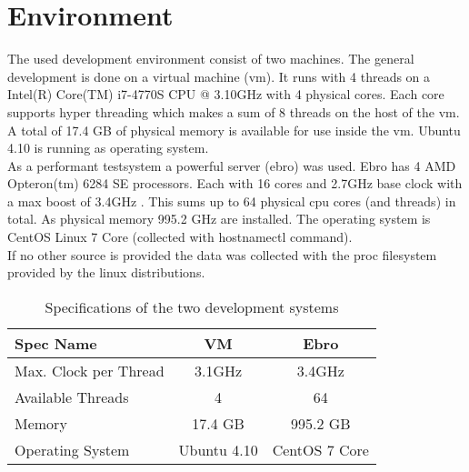 \section{Environment}
\label{env}
The used development environment consist of two machines. The general development is done on a virtual machine (vm). It runs with 4 threads on a Intel(R) Core(TM) i7-4770S CPU @ 3.10GHz with 4 physical cores. Each core supports hyper threading which makes a sum of 8 threads on the host of the vm. A total of 17.4 GB of physical memory is available for use inside the vm. Ubuntu 4.10 is running as operating system.\\
As a performant testsystem a powerful server (ebro) was used. Ebro has 4 AMD Opteron(tm) 6284 SE processors. Each with 16 cores and 2.7GHz base clock with a max boost of 3.4GHz \cite{AMDSpecs}. This sums up to 64 physical cpu cores (and threads) in total. As physical memory 995.2 GHz are installed. The operating system is CentOS Linux 7 Core (collected with hostnamectl command).\\
If no other source is provided the data was collected with the proc filesystem provided by the linux distributions.
\begin{center}
    \begin{table}[H]
        \centering
        \begin{tabular}{ | l | c | c |}
            \hline
            \textbf{Spec Name} & \textbf{VM} & \textbf{Ebro} \\ \hline
            Max. Clock per Thread & 3.1GHz & 3.4GHz \\ 
            Available Threads & 4 & 64 \\ 
            Memory & 17.4 GB & 995.2 GB\\ 
            Operating System & Ubuntu 4.10 & CentOS 7 Core \\ \hline
        \end{tabular}
        \caption{Specifications of the two development systems}
    \end{table}
\end{center}



